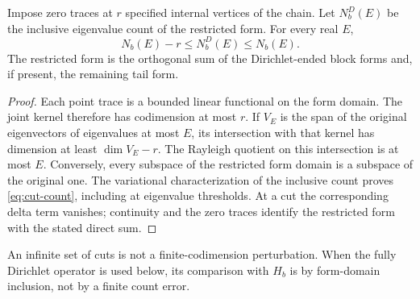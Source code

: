 \begin{lemma}
\label{lem:cuts}
Impose zero traces at $r$ specified internal vertices of the chain.
Let $N_b^D(E)$ be the inclusive eigenvalue count of the restricted
form. For every real $E$,
\begin{equation}
 N_b(E)-r\le N_b^D(E)\le N_b(E).
 \label{eq:cut-count}
\end{equation}
The restricted form is the orthogonal sum of the Dirichlet-ended
block forms and, if present, the remaining tail form.
\end{lemma}

\begin{proof}
Each point trace is a bounded linear functional on the form domain.
The joint kernel therefore has codimension at most $r$. If $V_E$
is the span of the original eigenvectors of eigenvalues at most
$E$, its intersection with that kernel has dimension at least
$\dim V_E-r$. The Rayleigh quotient on this intersection is at
most $E$. Conversely, every subspace of the restricted form domain
is a subspace of the original one. The variational characterization
of the inclusive count proves \eqref{eq:cut-count}, including at
eigenvalue thresholds. At a cut the corresponding delta term
vanishes; continuity and the zero traces identify the restricted
form with the stated direct sum.
\end{proof}

\begin{remark}
An infinite set of cuts is not a finite-codimension perturbation.
When the fully Dirichlet operator is used below, its comparison
with $H_b$ is by form-domain inclusion, not by a finite count error.
\end{remark}
